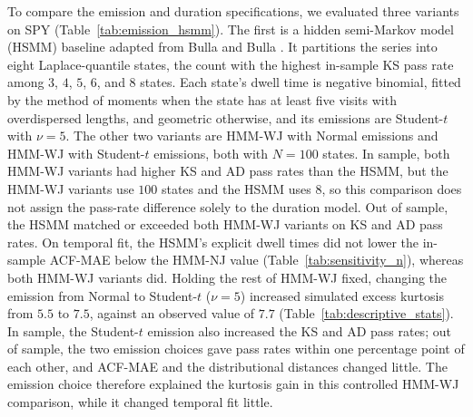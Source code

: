 To compare the emission and duration specifications, we evaluated
three variants on SPY (Table~\ref{tab:emission_hsmm}). The first is a
hidden semi-Markov model (HSMM) baseline adapted from Bulla and Bulla
\cite{bullaBulla2006}. It partitions the series into eight
Laplace-quantile states, the count with the highest in-sample KS pass
rate among $3$, $4$, $5$, $6$, and $8$ states. Each state's dwell
time is negative binomial, fitted by the method of moments when the
state has at least five visits with overdispersed lengths, and
geometric otherwise, and its emissions are Student-$t$ with $\nu = 5$.
The other two variants are HMM-WJ with Normal emissions and HMM-WJ
with Student-$t$ emissions, both with $N = 100$ states. In sample,
both HMM-WJ variants had higher KS and AD pass rates than the HSMM,
but the HMM-WJ variants use $100$ states and the HSMM uses $8$, so
this comparison does not assign the pass-rate difference solely to
the duration model. Out of sample, the HSMM matched or exceeded both
HMM-WJ variants on KS and AD pass rates. On temporal fit, the HSMM's
explicit dwell times did not lower the in-sample ACF-MAE below the
HMM-NJ value (Table~\ref{tab:sensitivity_n}), whereas both HMM-WJ
variants did. Holding the rest of HMM-WJ fixed, changing the emission
from Normal to Student-$t$ ($\nu=5$) increased simulated excess
kurtosis from $5.5$ to $7.5$, against an observed value of $7.7$
(Table~\ref{tab:descriptive_stats}). In sample, the Student-$t$
emission also increased the KS and AD pass rates; out of sample, the
two emission choices gave pass rates within one percentage point of
each other, and ACF-MAE and the distributional distances changed
little. The emission choice therefore explained the kurtosis gain in
this controlled HMM-WJ comparison, while it changed temporal fit
little.

